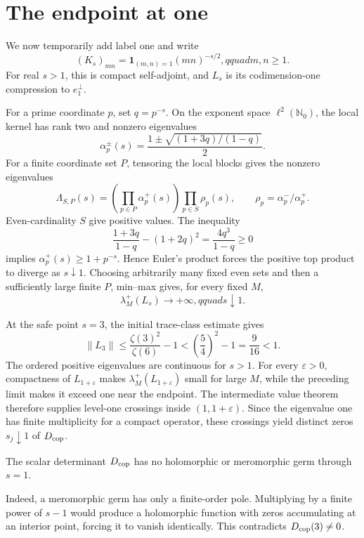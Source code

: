 \section{The endpoint at one}

We now temporarily add label one and write
\[
 (K_s)_{mn}=\mathbf 1_{(m,n)=1}(mn)^{-s/2},qquad m,n\ge1.
\]
For real \(s>1\), this is compact self-adjoint, and \(L_s\) is its
codimension-one compression to \(e_1^\perp\).

For a prime coordinate \(p\), set \(q=p^{-s}\).  On the exponent space
\(\ell^2(\mathbb N_0)\), the local kernel has rank two and nonzero
eigenvalues
\[
 \alpha_p^\pm(s)=\frac{1\pm\sqrt{(1+3q)/(1-q)}}2.
\]
For a finite coordinate set \(P\), tensoring the local blocks gives the
nonzero eigenvalues
\[
 \Lambda_{S,P}(s)=\left(\prod_{p\in P}\alpha_p^+(s)\right)
 \prod_{p\in S}\rho_p(s),
 \qquad \rho_p=\alpha_p^-/\alpha_p^+.
\]
Even-cardinality \(S\) give positive values.  The inequality
\[
 \frac{1+3q}{1-q}-(1+2q)^2=\frac{4q^3}{1-q}\ge0
\]
implies \(\alpha_p^+(s)\ge1+p^{-s}\).  Hence Euler's product forces the
positive top product to diverge as \(s\downarrow1\).  Choosing arbitrarily
many fixed even sets and then a sufficiently large finite \(P\), min--max
gives, for every fixed \(M\),
\[
 \lambda_M^+(L_s)\longrightarrow+\infty,qquad s\downarrow1.
\]

At the safe point \(s=3\), the initial trace-class estimate gives
\[
 \|L_3\|\le\frac{\zeta(3)^2}{\zeta(6)}-1
 <\left(\frac54\right)^2-1=\frac9{16}<1.
\]
The ordered positive eigenvalues are continuous for \(s>1\).  For every
\(\varepsilon>0\), compactness of \(L_{1+\varepsilon}\) makes
\(\lambda_M^+(L_{1+\varepsilon})\) small for large \(M\), while the preceding
limit makes it exceed one near the endpoint.  The intermediate value theorem
therefore supplies level-one crossings inside \((1,1+\varepsilon)\).  Since
the eigenvalue one has finite multiplicity for a compact operator, these
crossings yield distinct zeros \(s_j\downarrow1\) of \(D_{\mathrm{cop}}\).

\begin{theorem}
The scalar determinant \(D_{\mathrm{cop}}\) has no holomorphic or meromorphic germ
through \(s=1\).
\end{theorem}

Indeed, a meromorphic germ has only a finite-order pole.  Multiplying by a
finite power of \(s-1\) would produce a holomorphic function with zeros
accumulating at an interior point, forcing it to vanish identically.  This
contradicts \(D_{\mathrm{cop}}(3)\ne0\).

